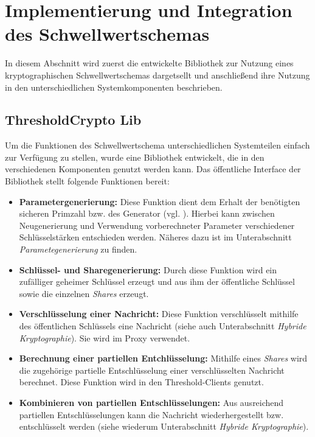 \section{Implementierung und Integration des Schwellwertschemas}

\label{sec_impl_threshold}

In diesem Abschnitt wird zuerst die entwickelte Bibliothek zur Nutzung eines kryptographischen Schwellwertschemas dargetsellt und anschließend ihre Nutzung in den unterschiedlichen Systemkomponenten beschrieben.

\subsection{ThresholdCrypto \glqq Lib\grqq{}}

%

Um die Funktionen des Schwellwertschema unterschiedlichen Systemteilen einfach zur Verfügung zu stellen, wurde eine Bibliothek entwickelt, die in den verschiedenen Komponenten genutzt werden kann. Das öffentliche Interface der Bibliothek stellt folgende Funktionen bereit:

\begin{itemize}
  \item \textbf{Parametergenerierung: } Diese Funktion dient dem Erhalt der benötigten sicheren Primzahl bzw. des Generator (vgl. ). Hierbei kann zwischen Neugenerierung und Verwendung vorberechneter Parameter verschiedener Schlüsselstärken entschieden werden. Näheres dazu ist im Unterabschnitt \textit{Parametegenerierung} zu finden.
  \item \textbf{Schlüssel- und Sharegenerierung: } Durch diese Funktion wird ein zufälliger geheimer Schlüssel erzeugt und aus ihm der öffentliche Schlüssel sowie die einzelnen \textit{Shares} erzeugt. 
  \item \textbf{Verschlüsselung einer Nachricht: } Diese Funktion verschlüsselt mithilfe des öffentlichen Schlüssels eine Nachricht (siehe auch Unterabschnitt \textit{Hybride Kryptographie}). Sie wird im Proxy verwendet.
  \item \textbf{Berechnung einer partiellen Entchlüsselung: } Mithilfe eines \textit{Shares} wird die zugehörige partielle Entschlüsselung einer verschlüsselten Nachricht berechnet. Diese Funktion wird in den Threshold-Clients genutzt.
  \item \textbf{Kombinieren von partiellen Entschlüsselungen: } Aus ausreichend partiellen Entschlüsselungen kann die Nachricht wiederhergestellt bzw. entschlüsselt werden (siehe wiederum Unterabschnitt \textit{Hybride Kryptographie}).
\end{itemize}

